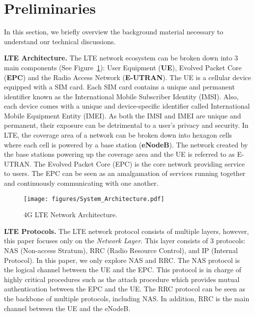 \section{Preliminaries}
\label{sec:preliminary}

In this section, we briefly overview the background material necessary to understand
our technical discussions.


\textbf{LTE Architecture.}
The LTE network ecosystem can be broken down into 3 main components
(See Figure~\ref{fig:lte_architecture}): User Equipment (\textbf{UE}),
Evolved Packet Core (\textbf{EPC}) and the Radio Access Network (\textbf{E-UTRAN}).
The UE is a cellular device equipped with a SIM card. Each SIM card contains a
unique and permanent identifier known as the International Mobile Subscriber Identity (IMSI).
Also, each  device comes with a unique and device-specific identifier called
International Mobile Equipment Entity (IMEI). As both the IMSI and IMEI are unique
and permanent, their exposure can be detrimental to a user's privacy and security.
In LTE, the coverage area of a network can be broken down into hexagon cells where
each cell is powered by a base station (\textbf{eNodeB}). The network created by
the base stations powering up the coverage area and the UE is referred to as E-UTRAN.
The Evolved Packet Core (EPC) is the core network providing service to users.
The EPC can be seen as an amalgamation of services running together and continuously communicating with one another.

\begin{figure}[t]
	\centering
	\texttt{[image: figures/System\_Architecture.pdf]}
	\caption{4G LTE Network Architecture.}
	\label{fig:lte_architecture}
\end{figure}


\textbf{LTE Protocols.}
The LTE network protocol consists of multiple layers, however,
this paper focuses only on the \emph{Network Layer}. This layer
consists of 3 protocols: NAS (Non-access Stratum), RRC (Radio Resource Control),
and IP (Internal Protocol). In this paper, we only explore NAS and RRC.
The NAS protocol is the logical channel between the UE and the EPC.
This protocol is in charge of highly critical procedures such as the
attach procedure which provides mutual authentication between the EPC and the UE.
The RRC protocol can be seen as the backbone of multiple protocols, including NAS.
In addition, RRC is the main channel between the UE and the eNodeB.

